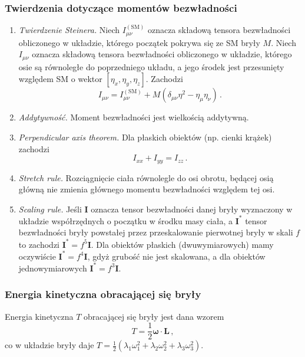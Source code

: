 \documentclass[../main.tex]{subfiles}
\begin{document}
\subsubsection*{Twierdzenia dotyczące momentów bezwładności}
\begin{enumerate}
    \item \textit{Twierdzenie Steinera.} Niech \(I_{\mu\nu}^{(\text{SM})}\) oznacza składową tensora bezwładności obliczonego w układzie, którego początek pokrywa się ze SM bryły \(M\). Niech \(I_{\mu\nu}\) oznacza składową tensora bezwładności obliczonego w układzie, którego osie są równoległe do poprzedniego układu, a jego środek jest przesunięty względem SM o wektor \([\eta_x, \eta_y,\eta_z]\). Zachodzi
    \begin{equation*}
        I_{\mu\nu}=I_{\mu\nu}^{(\text{SM})}+M\left(\delta_{\mu\nu}\eta^2-\eta_\mu\eta_\nu\right)\,.
    \end{equation*}
    
    \item \textit{Addytywność.} Moment bezwładności jest wielkością addytywną.
    \item \textit{Perpendicular axis theorem.} Dla płaskich obiektów (np. cienki krążek) zachodzi
    \begin{equation*}
        I_{xx}+I_{yy}=I_{zz}\,.
    \end{equation*}
    \item \textit{Stretch rule.} Rozciągnięcie ciała równolegle do osi obrotu, będącej osią główną nie zmienia głównego momentu bezwładności względem tej osi.
    \item \textit{Scaling rule.} Jeśli \(\mathbf{I}\) oznacza tensor bezwładności danej bryły wyznaczony w układzie współrzędnych o początku w środku masy ciała, a \(\mathbf{I}^*\) tensor bezwładności bryły powstałej przez przeskalowanie pierwotnej bryły w skali \(f\) to zachodzi \(\mathbf{I}^*=f^5\mathbf{I}\). Dla obiektów płaskich (dwuwymiarowych) mamy oczywiście \(\mathbf{I}^*=f^4\mathbf{I}\), gdyż grubość nie jest skalowana, a dla obiektów jednowymiarowych \(\mathbf{I}^*=f^3\mathbf{I}\).
\end{enumerate}

\subsubsection*{Energia kinetyczna obracającej się bryły}
Energia kinetyczna \(T\) obracającej się bryły jest dana wzorem
\begin{equation*}
    T=\frac{1}{2}\boldsymbol{\omega}\cdot \mathbf{L}\,,
\end{equation*}
co w układzie bryły daje \(T=\frac{1}{2}(\lambda_1\omega_1^2+\lambda_2\omega_2^2+\lambda_3\omega_3^2)\). 
\end{document}
